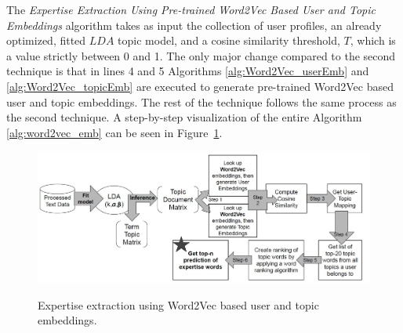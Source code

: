             The \emph{Expertise Extraction Using Pre-trained Word2Vec Based User and Topic Embeddings} algorithm takes as input the collection of user profiles, an already optimized, fitted $LDA$ topic model, and a cosine similarity threshold, $T$, which is a value strictly between 0 and 1. The only major change compared to the second technique is that in lines 4 and 5 Algorithms \ref{alg:Word2Vec_userEmb} and \ref{alg:Word2Vec_topicEmb} are executed to generate pre-trained Word2Vec based user and topic embeddings. The rest of the technique follows the same process as the second technique. A step-by-step visualization of the entire Algorithm \ref{alg:word2vec_emb} can be seen in Figure~\ref{fig:technique3}.
            
            \begin{figure}[!ht]
              \centering
              \includegraphics[width=\textwidth]{figures/technique3.JPG}\\
              \caption{Expertise extraction using Word2Vec based user and topic embeddings.}
              \label{fig:technique3}
            \end{figure}
        
